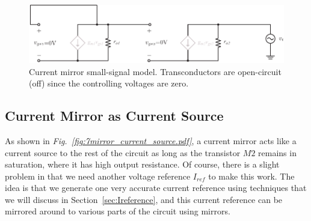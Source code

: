 \begin{figure}[H]
\centering
\includegraphics[scale=0.95]{8mirror_small_signal.pdf}
\caption{Current mirror small-signal model.  Transconductors are open-circuit (off) since the controlling voltages are zero.}
\label{fig:mirror_small_signal}
\end{figure}
\subsection{Current Mirror as Current Source}
As shown in \emph{Fig.~\ref{fig:7mirror_current_source.pdf}}, a current mirror acts like a current source to the rest of the circuit as long as the transistor $M2$ remains in saturation, where it has high output resistance.  Of course, there is a slight problem in that we need another voltage reference $I_{ref}$ to make this work.  The idea is that we generate one very accurate current reference using techniques that we will discuss in Section~\ref{sec:Ireference}, and this current reference can be mirrored around to various parts of the circuit using mirrors.  
